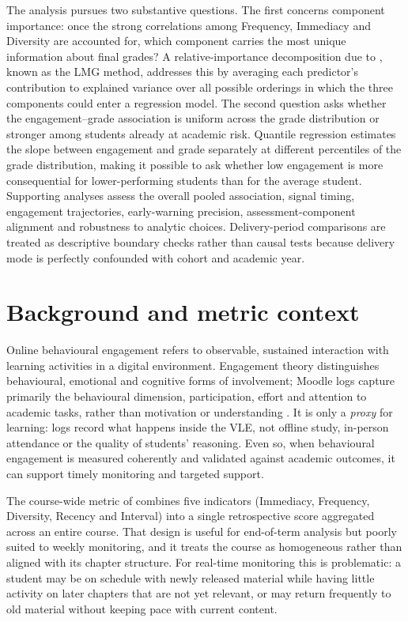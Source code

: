 \documentclass[11pt,a4paper]{article}
\begin{document}
The analysis pursues two substantive questions. The first concerns component
importance: once the strong correlations among Frequency, Immediacy and Diversity
are accounted for, which component carries the most unique information about
final grades? A relative-importance decomposition due to \citet{lindeman1980},
known as the LMG method, addresses this by averaging each predictor's
contribution to explained variance over all possible orderings in which the
three components could enter a regression model. The second question asks whether
the engagement--grade association is uniform across the grade distribution or
stronger among students already at academic risk. Quantile regression estimates
the slope between engagement and grade separately at different percentiles of the
grade distribution, making it possible to ask whether low engagement is more
consequential for lower-performing students than for the average student.
Supporting analyses assess the overall pooled association, signal timing,
engagement trajectories, early-warning precision, assessment-component alignment
and robustness to analytic choices. Delivery-period comparisons are treated as
descriptive boundary checks rather than causal tests because delivery mode is
perfectly confounded with cohort and academic year.

\section{Background and metric context}
Online behavioural engagement refers to observable, sustained interaction with
learning activities in a digital environment. Engagement theory distinguishes
behavioural, emotional and cognitive forms of involvement; Moodle logs capture
primarily the behavioural dimension, participation, effort and attention to
academic tasks, rather than motivation or understanding
\citep{fredricks2004,henrie2015,martinborup2022}. It is only a \emph{proxy} for learning: logs
record what happens inside the VLE, not offline study, in-person attendance or
the quality of students' reasoning. Even so, when behavioural engagement is
measured coherently and validated against academic outcomes, it can support
timely monitoring and targeted support.

The course-wide metric of \citet{chong2019} combines five indicators (Immediacy,
Frequency, Diversity, Recency and Interval) into a single retrospective score
aggregated across an entire course. That design is useful for end-of-term analysis
but poorly suited to weekly monitoring, and it treats the course as homogeneous
rather than aligned with its chapter structure. For real-time monitoring this is
problematic: a student may be on schedule with newly released material while
having little activity on later chapters that are not yet relevant, or may return
frequently to old material without keeping pace with current content.
\end{document}
